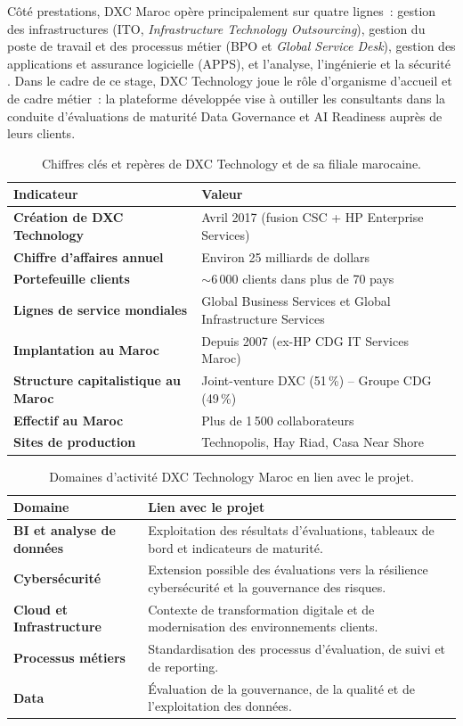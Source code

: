 \documentclass[12pt,a4paper]{report}
\begin{document}
Côté prestations, DXC Maroc opère principalement sur quatre lignes~: gestion des infrastructures (ITO, \textit{Infrastructure Technology Outsourcing}), gestion du poste de travail et des processus métier (BPO et \textit{Global Service Desk}), gestion des applications et assurance logicielle (APPS), et l'analyse, l'ingénierie et la sécurité \cite{dxcorg}. Dans le cadre de ce stage, DXC Technology joue le rôle d'organisme d'accueil et de cadre métier~: la plateforme développée vise à outiller les consultants dans la conduite d'évaluations de maturité Data Governance et AI Readiness auprès de leurs clients.

\begin{table}[H]
\centering
\caption{Chiffres clés et repères de DXC Technology et de sa filiale marocaine.}
\begin{tabularx}{\textwidth}{>{\bfseries}L{4.5cm}Y}
\toprule
Indicateur & Valeur \\
\midrule
Création de DXC Technology & Avril 2017 (fusion CSC + HP Enterprise Services) \\
Chiffre d'affaires annuel & Environ 25 milliards de dollars \\
Portefeuille clients & ${\sim}6\,000$ clients dans plus de 70 pays \\
Lignes de service mondiales & Global Business Services et Global Infrastructure Services \\
Implantation au Maroc & Depuis 2007 (ex-HP CDG IT Services Maroc) \\
Structure capitalistique au Maroc & Joint-venture DXC (51\,\%) -- Groupe CDG (49\,\%) \\
Effectif au Maroc & Plus de 1\,500 collaborateurs \\
Sites de production & Technopolis, Hay Riad, Casa Near Shore \\
\bottomrule
\end{tabularx}
\label{tab:dxc-chiffres}
\end{table}

\begin{table}[H]
\centering
\caption{Domaines d'activité DXC Technology Maroc en lien avec le projet.}
\begin{tabularx}{\textwidth}{>{\bfseries}L{4cm}Y}
\toprule
Domaine & Lien avec le projet \\
\midrule
BI et analyse de données & Exploitation des résultats d'évaluations, tableaux de bord et indicateurs de maturité. \\
Cybersécurité & Extension possible des évaluations vers la résilience cybersécurité et la gouvernance des risques. \\
Cloud et Infrastructure & Contexte de transformation digitale et de modernisation des environnements clients. \\
Processus métiers & Standardisation des processus d'évaluation, de suivi et de reporting. \\
Data & Évaluation de la gouvernance, de la qualité et de l'exploitation des données. \\
\bottomrule
\end{tabularx}
\end{table}
\end{document}
